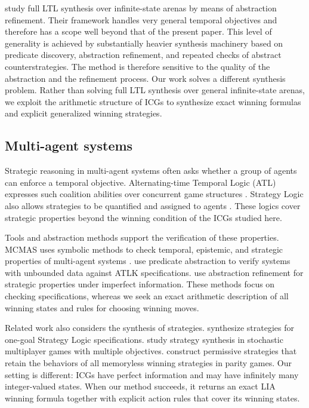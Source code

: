 \documentclass[review]{elsarticle}
\begin{document}
\citet{AzzopardiPDS2025} study full LTL synthesis over infinite-state arenas by means of abstraction refinement.
Their framework handles very general temporal objectives and therefore has a scope well beyond that of the present paper.
This level of generality is achieved by substantially heavier synthesis machinery based on predicate discovery, abstraction refinement, and repeated checks of abstract counterstrategies.
The method is therefore sensitive to the quality of the abstraction and the refinement process.
Our work solves a different synthesis problem.
Rather than solving full LTL synthesis over general infinite-state arenas, we exploit the arithmetic structure of ICGs to synthesize exact winning formulas and explicit generalized winning strategies.


\subsection{Multi-agent systems}

{\color{red}
Strategic reasoning in multi-agent systems often asks whether a group of agents can enforce a temporal objective.
Alternating-time Temporal Logic (ATL) expresses such coalition abilities over concurrent game structures \cite{AluHK2002}.
Strategy Logic also allows strategies to be quantified and assigned to agents \cite{MogMPV2014}.
These logics cover strategic properties beyond the winning condition of the ICGs studied here.
\par}

{\color{red}
Tools and abstraction methods support the verification of these properties.
MCMAS uses symbolic methods to check temporal, epistemic, and strategic properties of multi-agent systems \cite{LomQR2017}.
\citet{LomM2016} use predicate abstraction to verify systems with unbounded data against ATLK specifications.
\citet{BelFM2023} use abstraction refinement for strategic properties under imperfect information.
These methods focus on checking specifications, whereas we seek an exact arithmetic description of all winning states and rules for choosing winning moves.
\par}

{\color{red}
Related work also considers the synthesis of strategies.
\citet{CerLM2015} synthesize strategies for one-goal Strategy Logic specifications.
\citet{KwiPW2018} study strategy synthesis in stochastic multiplayer games with multiple objectives.
\citet{BerJW2002} construct permissive strategies that retain the behaviors of all memoryless winning strategies in parity games.
Our setting is different: ICGs have perfect information and may have infinitely many integer-valued states.
When our method succeeds, it returns an exact LIA winning formula together with explicit action rules that cover its winning states.
\par}
\end{document}
